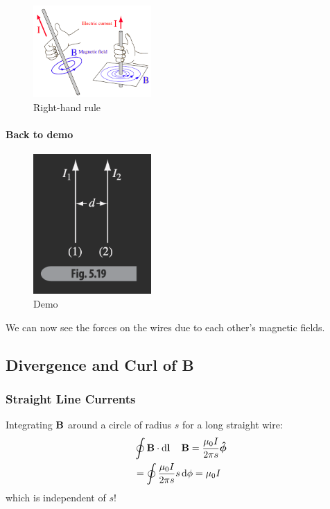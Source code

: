 \documentclass[../main.tex]{subfiles}
\begin{document}
\begin{figure}[ht]
    \centering
    \includegraphics[width=0.4\textwidth]{finger.png}
    \caption{Right-hand rule}
    \label{fig:finger}
\end{figure}

\paragraph{Back to demo}
\begin{figure}[ht]
    \centering
    \includegraphics[width=0.4\textwidth]{fig5_19.png}
    \caption{Demo}
    \label{fig:fig5_19}
\end{figure}
We can now see the forces on the wires due to each other's magnetic fields.

\newpage 
{}

\subsection{Divergence and Curl of B}
\subsubsection{Straight Line Currents}
Integrating $\vb B$ around a circle of radius $s$ for a long straight wire:
\begin{align*}
    &\oint \vb B \cdot \dd{\vb l} \quad \vb B = \frac{\mu_0 I}{2\pi s} \vu*\phi \\
    &= \oint \frac{\mu_0 I}{2\pi s} s \dd{\phi} = \mu_0 I
\end{align*}
which is independent of $s$!
\end{document}
